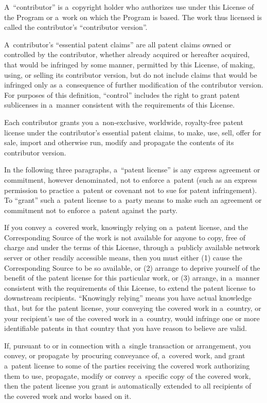 \documentclass[a4paper, 11pt, twoside]{article}
\begin{document}
A~“contributor” is a~copyright holder who authorizes use under this License of the Program or a~work on which the Program is based. The work thus licensed is called the contributor's “contributor version”.

A~contributor's “essential patent claims” are all patent claims owned or controlled by the contributor, whether already acquired or hereafter acquired, that would be infringed by some manner, permitted by this License, of making, using, or selling its contributor version, but do not include claims that would be infringed only as a~consequence of further modification of the contributor version. For purposes of this definition, “control” includes the right to grant patent sublicenses in a~manner consistent with the requirements of this License.

Each contributor grants you a~non-exclusive, worldwide, royalty-free patent license under the contributor's essential patent claims, to make, use, sell, offer for sale, import and otherwise run, modify and propagate the contents of its contributor version.

In the following three paragraphs, a~“patent license” is any express agreement or commitment, however denominated, not to enforce a~patent (such as an express permission to practice a~patent or covenant not to sue for patent infringement). To “grant” such a~patent license to a~party means to make such an agreement or commitment not to enforce a~patent against the party.

If you convey a~covered work, knowingly relying on a~patent license, and the Corresponding Source of the work is not available for anyone to copy, free of charge and under the terms of this License, through a~publicly available network server or other readily accessible means, then you must either (1) cause the Corresponding Source to be so available, or (2) arrange to deprive yourself of the benefit of the patent license for this particular work, or (3) arrange, in a~manner consistent with the requirements of this License, to extend the patent license to downstream recipients. “Knowingly relying” means you have actual knowledge that, but for the patent license, your conveying the covered work in a~country, or your recipient's use of the covered work in a~country, would infringe one or more identifiable patents in that country that you have reason to believe are valid.

If, pursuant to or in connection with a~single transaction or arrangement, you convey, or propagate by procuring conveyance of, a~covered work, and grant a~patent license to some of the parties receiving the covered work authorizing them to use, propagate, modify or convey a~specific copy of the covered work, then the patent license you grant is automatically extended to all recipients of the covered work and works based on it.
\end{document}
